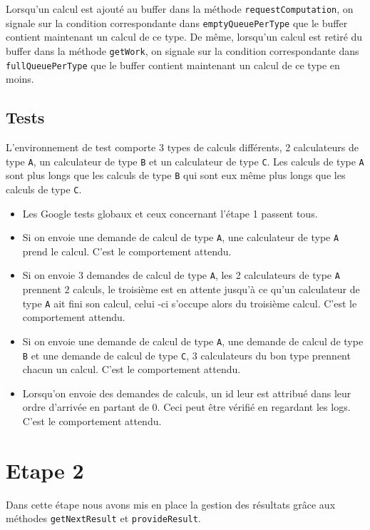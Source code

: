 \documentclass{article}
\begin{document}
Lorsqu'un calcul est ajouté au buffer dans la méthode \texttt{requestComputation}, on signale sur la condition correspondante
dans \texttt{emptyQueuePerType} que le buffer contient maintenant un calcul de ce type. De même, lorsqu'un calcul est
retiré du buffer dans la méthode \texttt{getWork}, on signale sur la condition correspondante dans \texttt{fullQueuePerType}
que le buffer contient maintenant un calcul de ce type en moins.

\subsection{Tests}
L'environnement de test comporte 3 types de calculs différents, 2 calculateurs de type \texttt{A}, un
calculateur de type \texttt{B} et un calculateur de type \texttt{C}. Les calculs de type \texttt{A} sont plus longs
que les calculs de type \texttt{B} qui sont eux même plus longs que les calculs de type \texttt{C}.

\pagebreak

\begin{itemize}
    \item Les Google tests globaux et ceux concernant l'étape 1 passent tous.
    \item Si on envoie une demande de calcul de type \texttt{A}, une calculateur de type \texttt{A} prend le calcul.
    C'est le comportement attendu.
    \item Si on envoie 3 demandes de calcul de type \texttt{A}, les 2 calculateurs de type \texttt{A} prennent 2
    calculs, le troisième est en attente jusqu'à ce qu'un calculateur de type \texttt{A} ait fini son calcul, celui
    -ci s'occupe alors du troisième calcul. C'est le comportement attendu.
    \item Si on envoie une demande de calcul de type \texttt{A}, une demande de calcul de type \texttt{B} et une
    demande de calcul de type \texttt{C}, 3 calculateurs du bon type prennent chacun un calcul. C'est le comportement attendu.
    \item Lorsqu'on envoie des demandes de calculs, un id leur est attribué dans leur ordre d'arrivée en partant de
    0. Ceci peut être vérifié en regardant les logs. C'est le comportement attendu.
\end{itemize}

\section{Etape 2}
Dans cette étape nous avons mis en place la gestion des résultats grâce aux méthodes \texttt{getNextResult} et
\texttt{provideResult}.
\end{document}
